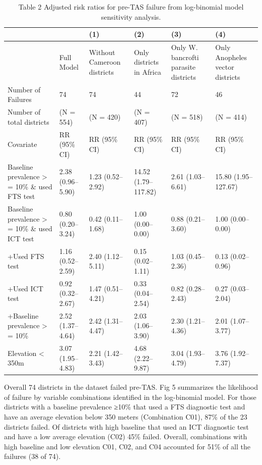 \documentclass[11pt,a4paper]{article}
\begin{document}
\begin{table}[h]
\caption{Table 2 Adjusted risk ratios for pre-TAS failure from log-binomial model sensitivity analysis.}
\begin{tabular}{|l|l|l|l|l|l|}
\hline
 &  & (1) & (2) & (3) & (4) \\ \hline
 & Full Model & Without Cameroon districts & Only districts in Africa & Only W. bancrofti parasite districts & Only Anopheles vector districts \\ \hline
Number of Failures & 74 & 74 & 44 & 72 & 46 \\ \hline
Number of total districts & (N = 554) & (N = 420) & (N = 407) & (N = 518) & (N = 414) \\ \hline
Covariate & RR (95\% CI) & RR (95\% CI) & RR (95\% CI) & RR (95\% CI) & RR (95\% CI) \\ \hline
Baseline prevalence > = 10\% \& used FTS test & 2.38 (0.96–5.90) & 1.23 (0.52–2.92) & 14.52 (1.79–117.82) & 2.61 (1.03–6.61) & 15.80 (1.95–127.67) \\ \hline
Baseline prevalence > = 10\% \& used ICT test & 0.80 (0.20–3.24) & 0.42 (0.11–1.68) & 1.00 (0.00–0.00) & 0.88 (0.21–3.60) & 1.00 (0.00–0.00) \\ \hline
+Used FTS test & 1.16 (0.52–2.59) & 2.40 (1.12–5.11) & 0.15 (0.02–1.11) & 1.03 (0.45–2.36) & 0.13 (0.02–0.96) \\ \hline
+Used ICT test & 0.92 (0.32–2.67) & 1.47 (0.51–4.21) & 0.33 (0.04–2.54) & 0.82 (0.28–2.43) & 0.27 (0.03–2.04) \\ \hline
+Baseline prevalence > = 10\% & 2.52 (1.37–4.64) & 2.42 (1.31–4.47) & 2.03 (1.06–3.90) & 2.30 (1.21–4.36) & 2.01 (1.07–3.77) \\ \hline
Elevation < 350m & 3.07 (1.95–4.83) & 2.21 (1.42–3.43) & 4.68 (2.22–9.87) & 3.04 (1.93–4.79) & 3.76 (1.92–7.37) \\ \hline
\end{tabular}
\end{table}

Overall 74 districts in the dataset failed pre-TAS. Fig 5 summarizes the likelihood of failure by variable combinations identified in the log-binomial model. For those districts with a baseline prevalence ≥10\% that used a FTS diagnostic test and have an average elevation below 350 meters (Combination C01), 87\% of the 23 districts failed. Of districts with high baseline that used an ICT diagnostic test and have a low average elevation (C02) 45\% failed. Overall, combinations with high baseline and low elevation C01, C02, and C04 accounted for 51\% of all the failures (38 of 74).
\end{document}
